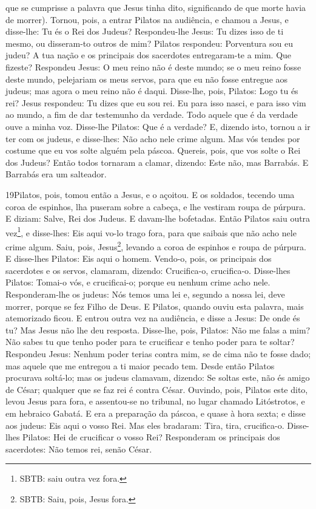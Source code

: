que se cumprisse a palavra que Jesus tinha dito,
significando de que morte havia de morrer). Tornou, pois, a
entrar Pilatos na audiência, e chamou a Jesus, e disse-lhe: Tu és o
Rei dos Judeus? Respondeu-lhe Jesus: Tu dizes isso de ti
mesmo, ou disseram-to outros de mim? Pilatos respondeu:
Porventura sou eu judeu? A tua nação e os principais dos sacerdotes
entregaram-te a mim. Que fizeste? Respondeu Jesus: O meu
reino não é deste mundo; se o meu reino fosse deste mundo,
pelejariam os meus servos, para que eu não fosse entregue aos
judeus; mas agora o meu reino não é daqui. Disse-lhe, pois,
Pilatos: Logo tu és rei? Jesus respondeu: Tu dizes que eu sou rei.
Eu para isso nasci, e para isso vim ao mundo, a fim de dar
testemunho da verdade. Todo aquele que é da verdade ouve a minha
voz. Disse-lhe Pilatos: Que é a verdade? E, dizendo isto,
tornou a ir ter com os judeus, e disse-lhes: Não acho nele crime
algum. Mas vós tendes por costume que eu vos solte alguém
pela páscoa. Quereis, pois, que vos solte o Rei dos Judeus?
Então todos tornaram a clamar, dizendo: Este não, mas
Barrabás. E Barrabás era um salteador.

\medskip

\lettrine{19} Pilatos, pois, tomou então a Jesus, e o açoitou.
E os soldados, tecendo uma coroa de espinhos, lha puseram sobre
a cabeça, e lhe vestiram roupa de púrpura. E diziam: Salve, Rei
dos Judeus. E davam-lhe bofetadas. Então Pilatos saiu outra
vez\footnote{SBTB: saiu outra vez fora.}, e disse-lhes: Eis aqui
vo-lo trago fora, para que saibais que não acho nele crime algum.
Saiu, pois, Jesus\footnote{SBTB: Saiu, pois, Jesus fora.},
levando a coroa de espinhos e roupa de púrpura. E disse-lhes
Pilatos: Eis aqui o homem. Vendo-o, pois, os principais dos
sacerdotes e os servos, clamaram, dizendo: Crucifica-o, crucifica-o.
Disse-lhes Pilatos: Tomai-o vós, e crucificai-o; porque eu nenhum
crime acho nele. Responderam-lhe os judeus: Nós temos uma lei e,
segundo a nossa lei, deve morrer, porque se fez Filho de Deus. E
Pilatos, quando ouviu esta palavra, mais atemorizado ficou. E
entrou outra vez na audiência, e disse a Jesus: De onde és tu? Mas
Jesus não lhe deu resposta. Disse-lhe, pois, Pilatos: Não me
falas a mim? Não sabes tu que tenho poder para te crucificar e tenho
poder para te soltar? Respondeu Jesus: Nenhum poder terias
contra mim, se de cima não te fosse dado; mas aquele que me entregou
a ti maior pecado tem. Desde então Pilatos procurava
soltá-lo; mas os judeus clamavam, dizendo: Se soltas este, não és
amigo de César; qualquer que se faz rei é contra César.
Ouvindo, pois, Pilatos este dito, levou Jesus para fora, e
assentou-se no tribunal, no lugar chamado Litóstrotos, e em hebraico
Gabatá. E era a preparação da páscoa, e quase à hora sexta; e
disse aos judeus: Eis aqui o vosso Rei. Mas eles bradaram:
Tira, tira, crucifica-o. Disse-lhes Pilatos: Hei de crucificar o
vosso Rei? Responderam os principais dos sacerdotes: Não temos rei,
senão César.

